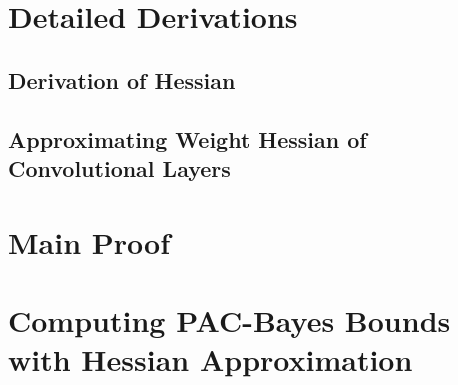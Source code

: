 \section{Detailed Derivations}
\label{sec:appendix_derivation_main}
\subsection{Derivation of Hessian}

\subsection{Approximating Weight Hessian of Convolutional Layers}

\newpage
\section{Main Proof}
\label{sec:main-proof-full}

\newpage




% 
% 
% 
\newpage

\newpage
\section{Computing PAC-Bayes Bounds with Hessian Approximation}
